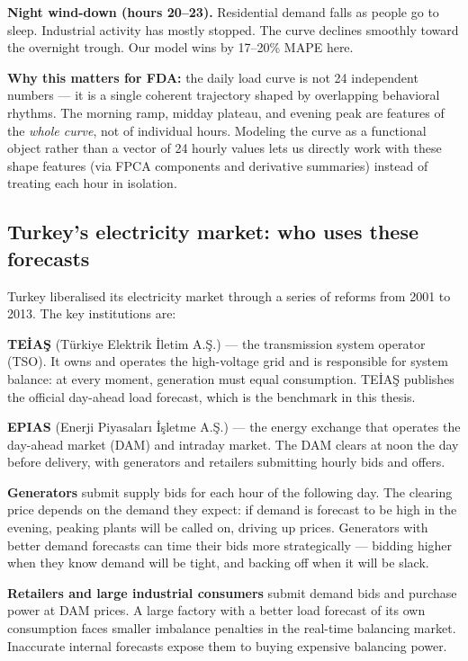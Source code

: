 \documentclass[11pt,a4paper]{article}
\begin{document}
\textbf{Night wind-down (hours 20--23).}
Residential demand falls as people go to sleep. Industrial activity
has mostly stopped. The curve declines smoothly toward the overnight
trough. Our model wins by 17--20\% MAPE here.

\begin{intuitionbox}
\textbf{Why this matters for FDA:} the daily load curve is not 24
independent numbers --- it is a single coherent trajectory shaped
by overlapping behavioral rhythms. The morning ramp, midday plateau,
and evening peak are features of the \emph{whole curve}, not of
individual hours. Modeling the curve as a functional object rather
than a vector of 24 hourly values lets us directly work with these
shape features (via FPCA components and derivative summaries) instead
of treating each hour in isolation.
\end{intuitionbox}

\subsection{Turkey's electricity market: who uses these forecasts}

Turkey liberalised its electricity market through a series of reforms
from 2001 to 2013. The key institutions are:

\textbf{TEİAŞ} (Türkiye Elektrik İletim A.Ş.) --- the transmission
system operator (TSO). It owns and operates the high-voltage grid and is
responsible for system balance: at every moment, generation must equal
consumption. TEİAŞ publishes the official day-ahead load forecast, which
is the benchmark in this thesis.

\textbf{EPIAS} (Enerji Piyasaları İşletme A.Ş.) --- the energy exchange
that operates the day-ahead market (DAM) and intraday market. The DAM
clears at noon the day before delivery, with generators and retailers
submitting hourly bids and offers.

\textbf{Generators} submit supply bids for each hour of the following
day. The clearing price depends on the demand they expect: if demand is
forecast to be high in the evening, peaking plants will be called on,
driving up prices. Generators with better demand forecasts can time their
bids more strategically --- bidding higher when they know demand will be
tight, and backing off when it will be slack.

\textbf{Retailers and large industrial consumers} submit demand bids and
purchase power at DAM prices. A large factory with a better load
forecast of its own consumption faces smaller imbalance penalties in the
real-time balancing market. Inaccurate internal forecasts expose them to
buying expensive balancing power.
\end{document}
